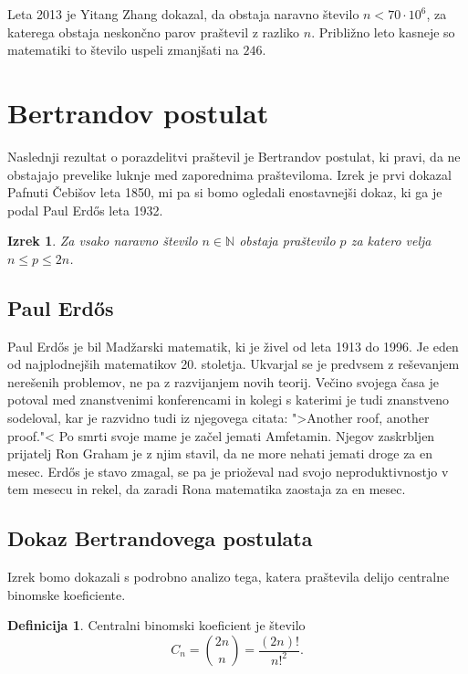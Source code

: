 \documentclass[a4paper,12pt]{article}
\def\N{\mathbb{N}}
\theoremstyle{definition}
\newtheorem{definicija}{Definicija}
\theoremstyle{plain}
\newtheorem{izrek}{Izrek}
\begin{document}
Leta 2013 je Yitang Zhang dokazal, da obstaja naravno število $n < 70 \cdot 10^6$, za katerega obstaja neskončno parov praštevil z razliko $n$. Približno leto kasneje so matematiki to število uspeli zmanjšati na $246$.






\section{Bertrandov postulat}
Naslednji rezultat o porazdelitvi praštevil je Bertrandov postulat, ki pravi, da ne obstajajo prevelike luknje med zaporednima prašteviloma. Izrek je prvi dokazal Pafnuti Čebišov leta 1850, mi pa si bomo ogledali enostavnejši dokaz, ki ga je podal Paul Erd\H{o}s leta 1932.

\begin{izrek}
    Za vsako naravno število $n \in \N$ obstaja praštevilo $p$ za katero velja $n \leq p \leq 2n$.
\end{izrek}


\subsection{Paul Erd\H{o}s}
Paul Erd\H{o}s je bil Madžarski matematik, ki je živel od leta 1913 do 1996. Je eden od najplodnejših matematikov 20. stoletja. Ukvarjal se je predvsem z reševanjem nerešenih problemov, ne pa z razvijanjem novih teorij. Večino svojega časa je potoval med znanstvenimi konferencami in kolegi s katerimi je tudi znanstveno sodeloval, kar je razvidno tudi iz njegovega citata: ">Another roof, another proof."< Po smrti svoje mame je začel jemati Amfetamin. Njegov zaskrbljen prijatelj Ron Graham je z njim stavil, da ne more nehati jemati droge za en mesec. Erd\H{o}s je stavo zmagal, se pa je prioževal nad svojo neproduktivnostjo v tem mesecu in rekel, da zaradi Rona matematika zaostaja za en mesec.


\subsection{Dokaz Bertrandovega postulata}
Izrek bomo dokazali s podrobno analizo tega, katera praštevila delijo centralne binomske koeficiente.

\begin{definicija} %
    Centralni binomski koeficient je število $$C_n = \binom{2n}{n} = \frac{(2n)!}{n!^2}.$$
\end{definicija}
\end{document}
